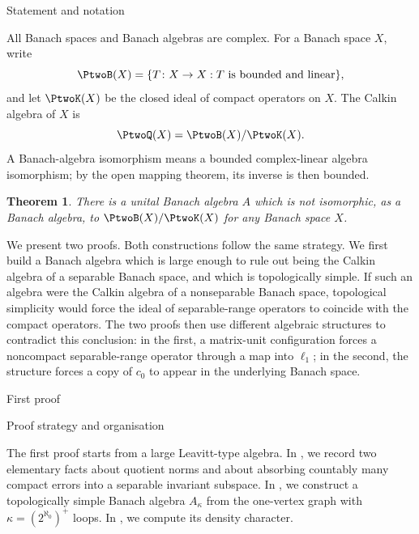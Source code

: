 \documentclass[11pt,reqno]{amsart}
\makeatletter
\theoremstyle{plain}
\newtheorem{theorem}{Theorem}[section]
\theoremstyle{definition}
\newcounter{problempaper}
\newenvironment{problempaperbody}{%
  \setcounter{subsection}{0}%
  \setcounter{subsubsection}{0}%
  \setcounter{paragraph}{0}%
  \renewcommand{\thesubsection}{\arabic{subsection}}%
  \renewcommand{\thesubsubsection}{\thesubsection.\arabic{subsubsection}}%
  \renewcommand{\theparagraph}{\thesubsubsection.\arabic{paragraph}}%
  \let\problem@outersection\section
  \let\problem@outersubsection\subsection
  \let\problem@outersubsubsection\subsubsection
  \let\problem@outerparagraph\paragraph
  \let\section\problem@papersection
  \let\subsection\problem@papersubsection
  \let\subsubsection\problem@papersubsubsection
}{%
  \let\section\problem@outersection
  \let\subsection\problem@outersubsection
  \let\subsubsection\problem@outersubsubsection
  \let\paragraph\problem@outerparagraph
}
\newcommand{\problem@target}[2]{%
  \hypertarget{problem-\theproblempaper-#1-#2}{}%
}
\newcommand{\problem@paperheading}[3]{%
  \par\bigskip
  \problem@target{#1}{#2}%
  \noindent{\large\bfseries #2.\quad #3\par}%
  \nobreak\smallskip
}
\newcommand{\problem@papersubheading}[3]{%
  \par\medskip
  \problem@target{#1}{#2}%
  \noindent{\normalsize\bfseries #2.\quad #3\par}%
  \nobreak\smallskip
}
\newcommand{\problem@papersubsubheading}[3]{%
  \par\smallskip
  \problem@target{#1}{#2}%
  \noindent{\normalsize\itshape #2.\quad #3.\ }%
}
\def\problem@papersection{%
  \@ifstar{\problem@papersectionstar}{\problem@papersectionnostar}%
}
\def\problem@papersectionstar#1{%
  \par\bigskip\noindent{\large\bfseries #1\par}\nobreak\smallskip
}
\def\problem@papersectionnostar#1{%
  \refstepcounter{subsection}%
  \setcounter{subsubsection}{0}%
  \setcounter{paragraph}{0}%
  \problem@paperheading{section}{\thesubsection}{#1}%
  \problem@writecontentsline{section}{\thesubsection}{#1}%
}
\def\problem@papersubsection{%
  \@ifstar{\problem@papersubsectionstar}{\problem@papersubsectionnostar}%
}
\def\problem@papersubsectionstar#1{%
  \par\medskip\noindent{\normalsize\bfseries #1\par}\nobreak\smallskip
}
\def\problem@papersubsectionnostar#1{%
  \refstepcounter{subsubsection}%
  \setcounter{paragraph}{0}%
  \problem@papersubheading{subsection}{\thesubsubsection}{#1}%
  \problem@writecontentsline{subsection}{\thesubsubsection}{#1}%
}
\def\problem@papersubsubsection{%
  \@ifstar{\problem@papersubsubsectionstar}{\problem@papersubsubsectionnostar}%
}
\def\problem@papersubsubsectionstar#1{%
  \par\smallskip\noindent{\normalsize\itshape #1.\ }%
}
\def\problem@papersubsubsectionnostar#1{%
  \refstepcounter{paragraph}%
  \problem@papersubsubheading{subsubsection}{\theparagraph}{#1}%
  \problem@writecontentsline{subsubsection}{\theparagraph}{#1}%
}
\newcommand{\problem@writecontentsline}[3]{%
  \begingroup
  \protected@write\@auxout{}{%
    \string\problemcontentsentry{\theproblempaper}{#1}{#2}{#3}{\thepage}%
  }%
  \endgroup
}
\newcommand{\problemcontentsentry}[5]{%
  \@ifundefined{problemcontents@#1}{%
    \expandafter\gdef\csname problemcontents@#1\endcsname{}%
  }{}%
  \expandafter\g@addto@macro\csname problemcontents@#1\endcsname{%
    \problemcontentsline{#1}{#2}{#3}{#4}{#5}%
  }%
}
\newcommand{\problemcontentslink}[4]{%
  \hyperlink{problem-#1-#2-#3}{#4}%
}
\newcommand{\problemcontentsline}[5]{%
  \ifstrequal{#2}{section}{%
    \par\noindent
    \problemcontentslink{#1}{#2}{#3}{\makebox[2.5em][l]{#3}#4}%
    \nobreak\dotfill
    \problemcontentslink{#1}{#2}{#3}{#5}\par
  }{%
    \ifstrequal{#2}{subsection}{%
      \par\noindent\hspace*{1.5em}%
      \problemcontentslink{#1}{#2}{#3}{\makebox[3.5em][l]{#3}#4}%
      \nobreak\dotfill
      \problemcontentslink{#1}{#2}{#3}{#5}\par
    }{%
      \par\noindent\hspace*{3em}%
      \problemcontentslink{#1}{#2}{#3}{\makebox[4.5em][l]{#3}#4}%
      \nobreak\dotfill
      \problemcontentslink{#1}{#2}{#3}{#5}\par
    }%
  }%
}
\makeatother
\begin{document}
\begin{problempaperbody}

\section{Statement and notation}

All Banach spaces and Banach algebras are complex. For a Banach space $X$, write
\begin{equation*}
        \PtwoB(X)=\{T \colon X\to X:T\text{ is bounded and linear}\},
\end{equation*}
and let $\PtwoK(X)$ be the closed ideal of compact operators on $X$. The Calkin algebra of $X$ is
\begin{equation*}
        \PtwoQ(X)=\PtwoB(X)/\PtwoK(X).
\end{equation*}
A Banach-algebra isomorphism means a bounded complex-linear algebra isomorphism; by the open mapping theorem, its inverse is then bounded.

\begin{theorem}
\label{p2:thm:main}
There is a unital Banach algebra $A$ which is not isomorphic, as a Banach algebra, to $\PtwoB(X)/\PtwoK(X)$ for any Banach space $X$.
\end{theorem}

We present two proofs. Both constructions follow the same strategy. We first build a Banach algebra which is large enough to rule out being the Calkin algebra of a separable Banach space, and which is topologically simple. If such an algebra were the Calkin algebra of a nonseparable Banach space, topological simplicity would force the ideal of separable-range operators to coincide with the compact operators. The two proofs then use different algebraic structures to contradict this conclusion: in the first, a matrix-unit configuration forces a noncompact separable-range operator through a map into $\ell_1$; in the second, the structure forces a copy of $c_0$ to appear in the underlying Banach space.

\section{First proof}

\subsection{Proof strategy and organisation}

The first proof starts from a large Leavitt-type algebra. In , we record two elementary facts about quotient norms and about absorbing countably many compact errors into a separable invariant subspace. In , we construct a topologically simple Banach algebra $A_\kappa$ from the one-vertex graph with $\kappa=(2^{\aleph_0})^+$ loops. In , we compute its density character.


\end{problempaperbody}
\end{document}
